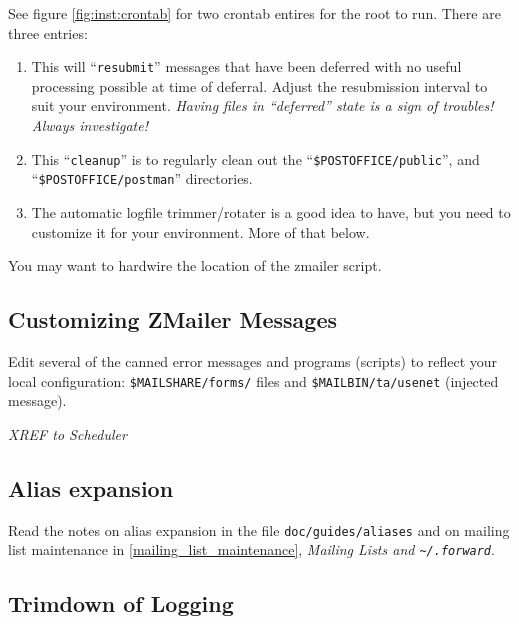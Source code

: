 See figure \vref{fig:inst:crontab} for two crontab entires for
the root to run.  There are three entries:
\begin{enumerate}
\item
This will ``{\tt resubmit}'' messages that have been deferred with
no useful processing possible at time of deferral.  Adjust the
resubmission interval to suit your environment.
{\em Having files in ``deferred'' state is a sign of troubles!
Always investigate!}

\item
This ``{\tt cleanup}'' is to regularly clean out
the ``{\tt \$POSTOFFICE/public}'', and ``{\tt \$POSTOFFICE/postman}''
directories.

\item
The automatic logfile trimmer/rotater is a good idea to have, but
you need to customize it for your environment.  More of that below.
\end{enumerate}

You may want to hardwire the location of the zmailer script.


\subsection{Customizing ZMailer Messages}

Edit several of the canned error messages and programs (scripts)
to reflect your local configuration: {\tt \$MAILSHARE/forms/} files and
{\tt \$MAILBIN/ta/usenet} (injected message).

{\large\em XREF to Scheduler}

\subsection{Alias expansion}

Read the notes on alias expansion in the file {\tt doc/guides/aliases} and
on mailing list maintenance in \vref{mailing_list_maintenance}, 
{\em Mailing Lists and \tt\~{}/.forward}.


\subsection{Trimdown of Logging}

